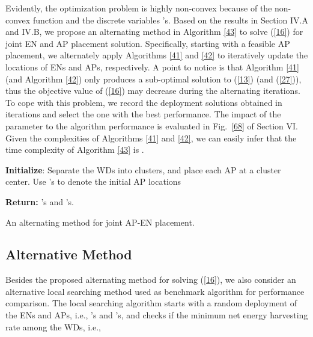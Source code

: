 \documentclass[journal, draftcls, one column, 12pt]{IEEEtran}
\begin{document}
Evidently, the optimization problem is highly non-convex because of the non-convex function  and the discrete variables 's. Based on the results in Section IV.A and IV.B, we propose an alternating method in Algorithm \ref{43} to solve (\ref{16}) for joint EN and AP placement solution. Specifically, starting with a feasible AP placement, we alternately apply Algorithms \ref{41} and \ref{42} to iteratively update the locations of ENs and APs, respectively. A point to notice is that Algorithm \ref{41} (and Algorithm \ref{42}) only produces a sub-optimal solution to (\ref{13}) (and (\ref{27})), thus the objective value of (\ref{16}) may decrease during the alternating iterations. To cope with this problem, we record the deployment solutions obtained in  iterations and select the one with the best performance. The impact of the parameter  to the algorithm performance is evaluated in Fig.~\ref{68} of Section VI. Given the complexities of Algorithms \ref{41} and \ref{42}, we can easily infer that the time complexity of Algorithm \ref{43} is .

\begin{algorithm}
\footnotesize
 \SetAlgoLined

 \textbf{Initialize}: Separate the WDs into  clusters, and place each AP at a cluster center. Use 's to denote the initial AP locations\;

\;
\textbf{Return:} 's and 's.

\caption{An alternating method for joint AP-EN placement.}
\label{43}
\end{algorithm}

\subsection{Alternative Method}
Besides the proposed alternating method for solving (\ref{16}), we also consider an alternative local searching method used as benchmark algorithm for performance comparison. The local searching algorithm starts with a random deployment of the  ENs and  APs, i.e., 's and 's, and checks if the minimum net energy harvesting rate among the WDs, i.e.,
\end{document}
